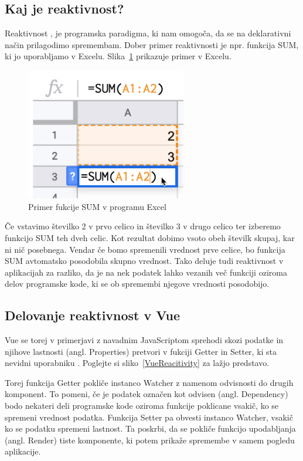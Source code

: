 \documentclass[a4paper, 12pt]{book}
\begin{document}
\subsection {Kaj je reaktivnost?}
Reaktivnost \cite{reaktivnost}, je programska paradigma, ki nam omogoča, da se na deklarativni način prilagodimo spremembam. Dober primer reaktivnosti je npr. funkcija SUM, ki jo uporabljamo v Excelu. Slika~\ref{Excel-SUM} prikazuje primer v Excelu.
\begin{figure}[h]
\begin{center}
\includegraphics[width=7cm]{Excel-SUM.png}
\end{center}
\caption{Primer fukcije SUM v programu Excel}
\label{Excel-SUM}
\end{figure}

Če vstavimo številko 2 v prvo celico in številko 3 v drugo celico ter izberemo funkcijo SUM teh dveh celic. Kot rezultat dobimo vsoto obeh številk skupaj, kar ni nič posebnega. Vendar če bomo spremenili vrednost prve celice, bo funkcija SUM avtomatsko posodobila skupno vrednost. Tako deluje tudi reaktivnost v aplikacijah za razliko, da je na nek podatek lahko vezanih več funkciji oziroma delov programske kode, ki se ob spremembi njegove vrednosti posodobijo.

\subsection {Delovanje reaktivnost v Vue}
Vue se torej v primerjavi z navadnim JavaScriptom sprehodi skozi podatke in njihove lastnosti (angl. Properties) pretvori v fukciji Getter in Setter, ki sta nevidni uporabniku \cite{delovanjeReaktivnost}. Poglejte si sliko~\ref{VueReacitivity} za lažjo predstavo. 

Torej funkcija Getter pokliče instanco Watcher z namenom odvisnosti do drugih komponent. To pomeni, če je podatek označen kot odvisen (angl.  Dependency) bodo nekateri deli programske kode oziroma funkcije poklicane vsakič, ko se spremeni vrednost podatka. Funkcija Setter pa obvesti instanco Watcher, vsakič ko se podatku spremeni lastnost. Ta poskrbi, da se pokliče funkcijo upodabljanja (angl. Render) tiste komponente, ki potem prikaže spremembe v samem pogledu aplikacije. 
\end{document}
